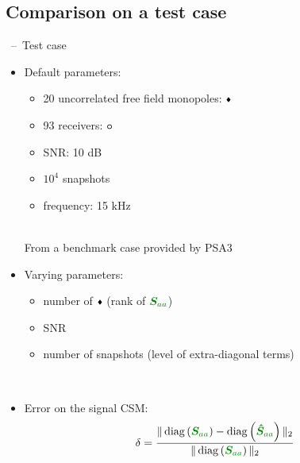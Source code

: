 \documentclass[10pt,xcolor=x11names,compress, notes=show]{beamer}%
\newcommand{\diag}[1]{\operatorname{diag}\left(#1\right)}
\begin{document}
\subsection{Comparison on a test case}
\begin{frame}{\insertsectionhead~--~Test case}
	
	\begin{itemize}
	\item Default parameters:
		\noindent\begin{minipage}{1.1\linewidth}
		     	\begin{minipage}{0.4\linewidth}		     		
	         			\begin{itemize}
					\item 20  uncorrelated free field monopoles: \textcolor{red}{$\vcenter{\hbox{\tiny$\blacklozenge$}}$}
					\item 93 receivers: \textcolor{colorAlice}{$\vcenter{\hbox{\small$\bm{\circ}$}}$}
					\item SNR: 10 dB
					\item $10^4$ snapshots
					\item frequency: 15 kHz
				\end{itemize}	
	               		\vfill
	     		\end{minipage}
	      		\hspace{0.5cm}
	     		 \begin{minipage}{0.5\linewidth}
             			\centering
             			\vspace{-0.5cm}
				\\
				{\scriptsize \textcolor{black!50}{\hspace{0.5cm} From a benchmark case provided by PSA3}\vspace{-1cm}
}
	      		\end{minipage}
		\end{minipage}
	
	\item Varying parameters: \\
	\begin{itemize}
	        \item number of   \textcolor{red}{$\vcenter{\hbox{\tiny$\blacklozenge$}}$} (rank of $\textcolor{green}{\bm{S}_{aa}}$)\\[3pt]
	        \item SNR\\[3pt]
	        \item number of snapshots (level of extra-diagonal terms)
\end{itemize}~\\	
	
	\item Error on the signal CSM:
	\begin{equation*}
   		 \delta = \frac{\|\diag{\textcolor{green}{\bm{S}_{aa}}}  - \diag{\textcolor{green}{\bm{\hat{S}}_{aa}}}\|_2}{\|\diag{\textcolor{green}{\bm{S}_{aa} }} \|_2}
	\end{equation*}
	\end{itemize}

\end{frame}
\end{document}
